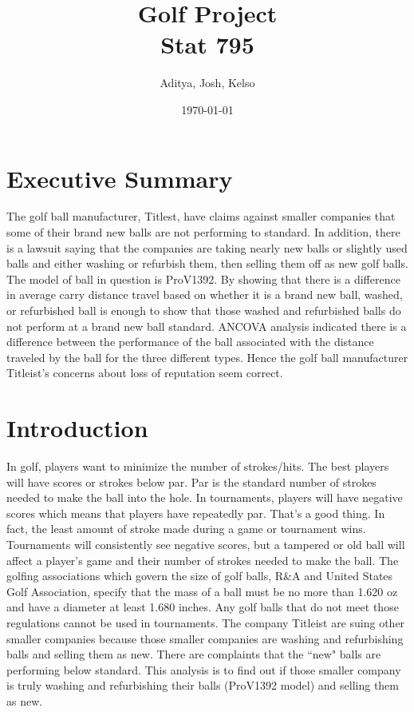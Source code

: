 \documentclass{article}\usepackage[]{graphicx}\usepackage[]{color}
\title{Golf Project \\
\large Stat 795}
\author{Aditya, Josh, Kelso}
\date{\today}
\makeatletter
\newcommand{\doublespacing}{\let\CS=\@currsize\renewcommand{
		\baselinestretch}{1.2}\small\CS}
\makeatother
\begin{document}
 
\maketitle




\doublespacing

\centering
\section*{Executive Summary}

The golf ball manufacturer, Titlest, have claims against smaller companies that some of their brand new balls are not performing to standard. In addition, there is a lawsuit saying that the companies are taking nearly new balls or slightly used balls and either washing or refurbish them, then selling them off as new golf balls. The model of ball in question is ProV1392. By showing that there is a difference in average carry distance travel based on whether it is a brand new ball, washed, or refurbished ball is enough to show that those washed and refurbished balls do not perform at a brand new ball standard.
ANCOVA analysis indicated there is a difference between the performance of the ball associated with the distance traveled by the ball for the three different types. Hence the golf ball manufacturer Titleist's concerns about loss of reputation seem correct. 

\section*{Introduction}

In golf, players want to minimize the number of strokes/hits. The best players will have scores or strokes below par. Par is the standard number of strokes needed to make the ball into the hole. In tournaments, players will have negative scores which means that players have repeatedly par. That’s a good thing. In fact, the least amount of stroke made during a game or tournament wins. Tournaments will consistently see negative scores, but a tampered or old ball will affect a player’s game and their number of strokes needed to make the ball.   
The golfing associations which govern the size of golf balls, R\&A and United States Golf Association, specify that the mass of a ball must be no more than 1.620 oz and have a diameter at least 1.680 inches. Any golf balls that do not meet those regulations cannot be used in tournaments. The company Titleist are suing other smaller companies because those smaller companies are washing and refurbishing balls and selling them as new. There are complaints that the ``new" balls are performing below standard. This analysis is to find out if those smaller company is truly washing and refurbishing their balls (ProV1392 model) and selling them as new. 
\end{document}
